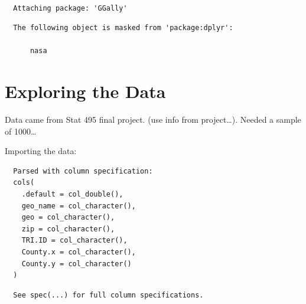 \documentclass[12pt,twoside]{amherstthesis}
\begin{document}
  \begin{verbatim}
  
  Attaching package: 'GGally'
  \end{verbatim}
  
  \begin{verbatim}
  The following object is masked from 'package:dplyr':
  
      nasa
  \end{verbatim}
  
  \section{Exploring the Data}\label{exploring-the-data}
  
  Data came from Stat 495 final project. (use info from project\ldots{}).
  Needed a sample of 1000\ldots{}
  
  Importing the data:
  
  \begin{Shaded}
  \begin{Highlighting}[]
  \StringTok{ }\NormalTok{(}\NormalTok{)}
  \end{Highlighting}
  \end{Shaded}
  
  \begin{verbatim}
  Parsed with column specification:
  cols(
    .default = col_double(),
    geo_name = col_character(),
    geo = col_character(),
    zip = col_character(),
    TRI.ID = col_character(),
    County.x = col_character(),
    County.y = col_character()
  )
  \end{verbatim}
  
  \begin{verbatim}
  See spec(...) for full column specifications.
  \end{verbatim}
  
  \begin{Shaded}
  \begin{Highlighting}[]
  \NormalTok{(}\NormalTok{)}
  \StringTok{ }\NormalTok{data_subset[}\NormalTok{(}\OperatorTok{:}\NormalTok{,}
     \NormalTok{),]}
  \end{Highlighting}
  \end{Shaded}
  
\end{document}
